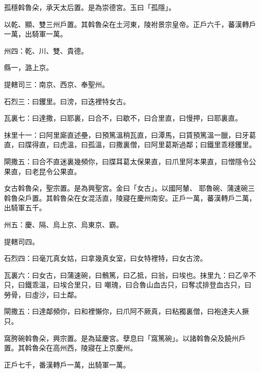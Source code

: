 \begin{pinyinscope}
 孤穩斡魯朵，承天太后置。是為崇德宮。玉曰「孤隱」。



 以乾、顯、雙三州戶置。其斡魯朵在土河東，陵袝景宗皇帝。正戶六千，蕃漢轉戶一萬，出騎軍一萬。



 州四：乾、川、雙、貴德。



 縣一，潞上京。



 提轄司三：南京、西京、奉聖州。



 石烈三：曰钁里。曰滂，曰迭裡特女古。



 瓦裏七：曰達撒，曰耶裏，曰合不，曰歇不，曰合里直，曰慢押，曰耶裏直。



 抹里十一：曰阿里廝直述壘，曰預篤溫稍瓦直，曰潭馬，曰賃預篤溫一臘，曰牙葛直，曰牒得直，曰虎溫，曰孤溫，曰撒裏僧，曰阿里葛斯過鄰；曰鐵里乖穩钁里。



 閘撒五：曰合不直迷裏幾頻你，曰牒耳葛太保果直，曰爪里阿本果直，曰憎隱令公果直，曰老昆令公果直。



 女古斡魯朵，聖宗置。是為興聖宮。金曰「女古」。以國阿輦、
 耶魯碗、蒲速碗三斡魯朵戶置。其斡魯朵在女混活直，陵寢在慶州南安。正戶一萬，蕃漢轉戶二萬，出騎軍五千。



 州五：慶、隔、烏上京、烏東京、霸。



 提轄司四。



 石烈四：曰毫兀真女姑，曰拿幾真女室，曰女特裡特，曰女古滂。



 瓦裏六：曰女古，曰蒲速碗，曰鶻篤，曰乙抵，曰翁，曰埃也。抹里九：曰乙辛不只，曰鐵乖溫，曰埃合里只，曰
 嘲瑰，曰合魯山血古只，曰奪忒排登血古只，曰勞骨，曰虛沙，曰土鄰。



 閘撒五：曰達鄰頻你，曰和裡懶你，曰爪阿不厥真，曰粘獨裏僧，曰袍達夫人撅只。



 窩胯碗斡魯朵，興宗置。是為延慶宮。孽息曰「窩篤碗」。以諸斡魯朵及饒州戶置。其斡魯朵在高州西，陵寢在上京慶州。



 正戶七千，番漢轉戶一萬，出騎軍一萬。




\end{pinyinscope}
